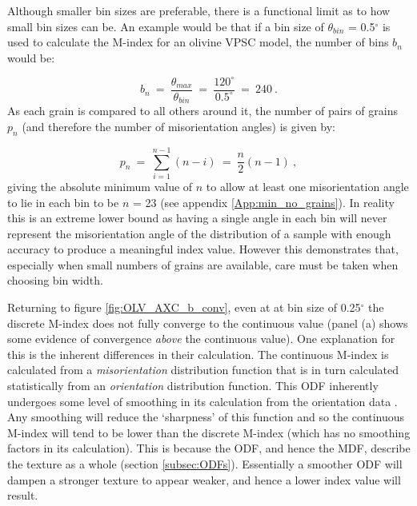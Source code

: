 \documentclass[a4paper,12pt,twoside]{report}
\numberwithin{equation}{chapter}
\begin{document}
Although smaller bin sizes are preferable, there is a functional limit as to how small bin sizes can be. An example would be that if a bin size of $\theta_{bin}$ = 0.5$^\circ$ is used to calculate the M-index for an olivine VPSC model, the number of bins $b_n$ would be:

\begin{equation}
b_n\ =\ \frac{\theta_{max}}{\theta_{bin}}\ =\ \frac{120^\circ}{0.5^\circ}\ =\ 240\ . 
\end{equation}     
\noindent
As each grain is compared to all others around it, the number of pairs of grains $p_n$ (and therefore the number of misorientation angles) is given by:

\begin{equation}
p_n\ =\ \sum^{n-1}_{i=1}(n - i)\ =\ \frac{n}{2}(n-1)\ ,
\end{equation} 
\noindent
giving the absolute minimum value of $n$ to allow at least one misorientation angle to lie in each bin to be $n$ = 23 (see appendix \ref{App:min_no_grains}). In reality this is an extreme lower bound as having a single angle in each bin will never represent the misorientation angle of the distribution of a sample with enough accuracy to produce a meaningful index value. However this demonstrates that, especially when small numbers of grains are available, care must be taken when choosing bin width. 

Returning to figure \ref{fig:OLV_AXC_b_conv}, even at at bin size of 0.25$^\circ$ the discrete M-index does not fully converge to the continuous value (panel (a) shows some evidence of convergence \emph{above} the continuous value). One explanation for this is the inherent differences in their calculation. The continuous M-index is calculated from a \emph{misorientation} distribution function that is in turn calculated statistically from an \emph{orientation} distribution function. This ODF inherently undergoes some level of smoothing in its calculation from the orientation data \citep[e.g. regularisation when inverting for the ODF in the \texttt{MTEX} algorithm, see][]{Hielscher2008}. Any smoothing will reduce the \lq{}sharpness\rq{} of this function and so the continuous M-index will tend to be lower than the discrete M-index (which has no smoothing factors in its calculation). This is because the ODF, and hence the MDF, describe the texture as a whole (section \ref{subsec:ODFs}). Essentially a smoother ODF will dampen a stronger texture to appear weaker, and hence a lower index value will result. 
\end{document}

